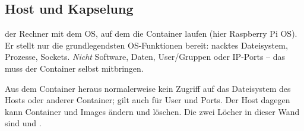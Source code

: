 \subsection{Host und Kapselung}
 der Rechner mit dem OS, auf dem die Container laufen (hier
Raspberry Pi OS). Er stellt nur die grundlegendsten OS-Funktionen bereit:
nacktes Dateisystem, Prozesse, Sockets. \emph{Nicht} Software, Daten,
User/Gruppen oder IP-Ports -- das muss der Container selbst mitbringen.

 Aus dem Container heraus normalerweise kein Zugriff auf das
Dateisystem des Hosts oder anderer Container; gilt auch für User und Ports.
Der Host dagegen kann Container und Images ändern und löschen.
Die zwei Löcher in dieser Wand sind  und .
